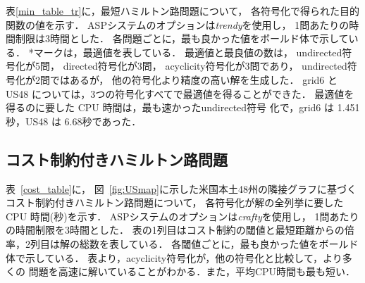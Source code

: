 
表\ref{min_table_tr}に，最短ハミルトン路問題について，
各符号化で得られた目的関数の値を示す．
ASPシステム{\clingo}のオプションは\textit{trendy}を使用し，
1問あたりの時間制限は3時間とした．
% 
各問題ごとに，最も良かった値をボールド体で示している．
*マークは，最適値を表している．
最適値と最良値の数は，
\textsf{undirected}符号化が5問，
\textsf{directed}符号化が3問，
\textsf{acyclicity}符号化が3問であり，
\textsf{undirected}符号化が2問ではあるが，
他の符号化より精度の高い解を生成した．
grid6 と US48 については，3つの符号化すべてで最適値を得ることができた．
最適値を得るのに要した CPU 時間は，最も速かった\textsf{undirected}符号
化で，grid6 は 1.451秒，US48 は 6.68秒であった．

\subsection{コスト制約付きハミルトン路問題}


表~\ref{cost_table}に，
図~\ref{fig:USmap}に示した米国本土48州の隣接グラフに基づく
コスト制約付きハミルトン路問題について，
各符号化が解の全列挙に要した CPU 時間(秒)を示す．
ASPシステム{\clingo}のオプションは\textit{crafty}を使用し，
1問あたりの時間制限を3時間とした．
表の1列目はコスト制約の閾値と最短距離からの倍率，2列目は解の総数を表している．
各閾値ごとに，最も良かった値をボールド体で示している．
表より，\textsf{acyclicity}符号化が，他の符号化と比較して，より多くの
問題を高速に解いていることがわかる．また，平均CPU時間も最も短い．


